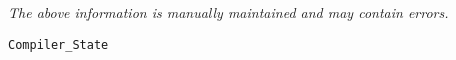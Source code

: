 \label{pkg:compiler\_state}

{\tiny \it The above information is manually maintained and may contain errors.}
\begin{verbatim}
Compiler_State
\end{verbatim}
